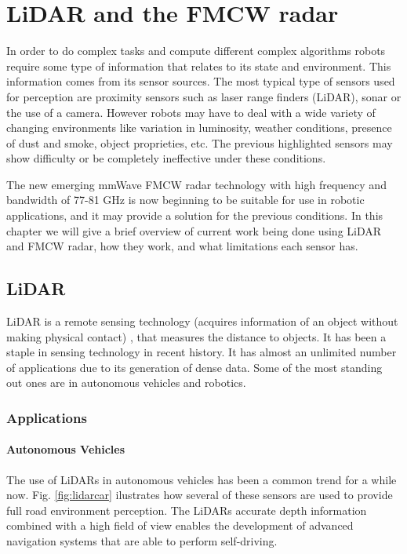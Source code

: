 \chapter{LiDAR and the FMCW radar} \label{ch:Concepts}

In order to do complex tasks and compute different complex algorithms robots require some type of information that relates to its state and environment. This information comes from its sensor sources.
The most typical type of sensors used for perception are proximity sensors such as laser range finders (\ac{LiDAR}), sonar or the use of a camera. However robots may have to deal with a wide variety of changing environments like variation in luminosity, weather conditions, presence of dust and smoke, object proprieties, etc. The previous highlighted sensors may show difficulty or be completely ineffective under these conditions.

The new emerging \ac{mmWave} \ac{FMCW} radar technology with high frequency and bandwidth of 77-81 GHz is now beginning to be suitable for use in robotic applications, and it may provide a solution for the previous conditions. In this chapter we will give a brief overview of current work being done using \ac{LiDAR} and \ac{FMCW} \ac{radar}, how they work, and what limitations each sensor has.

\section{LiDAR}
\ac{LiDAR} is a remote sensing technology (acquires information of an object without making physical contact) , that measures the distance to objects. It has been a staple in sensing technology in recent history. It has almost an  unlimited  number of applications \cite{lidar100uses} due to its generation of dense data. Some of the most standing out ones are in autonomous vehicles and robotics.
\subsection{Applications}

\subsubsection{Autonomous Vehicles}
The use of \ac{LiDAR}s in autonomous vehicles has been a common trend for a while now. Fig. \ref{fig:lidarcar} ilustrates how several of these sensors are used to provide full road environment perception. The \ac{LiDAR}s accurate depth information combined with a high field of view enables the development of advanced navigation systems that are able to perform self-driving.
 
